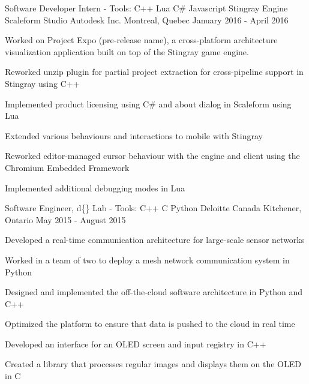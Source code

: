 


\begin{cventries}


\cventry
{Software Developer Intern - Tools: C++ \textbullet{} Lua \textbullet{} C\# \textbullet{} Javascript \textbullet{} Stingray Engine \textbullet{} Scaleform Studio}
{Autodesk Inc.}
{Montreal, Quebec}
{January 2016 - April 2016}
{ %
Worked on Project Expo (pre-release name), a cross-platform architecture visualization application built on top of the Stingray game engine.
\begin{cvitems}
\item[]
\item {Reworked unzip plugin for partial project extraction for cross-pipeline support in Stingray using C++}
\item {Implemented product licensing using C\# and about dialog in Scaleform using Lua}
\item {Extended various behaviours and interactions to mobile with Stingray}
\item {Reworked editor-managed cursor behaviour with the engine and client using the Chromium Embedded Framework}
\item {Implemented additional debugging modes in Lua}
\end{cvitems}
}


\cventry
{Software Engineer, d\{\} Lab - Tools: C++ \textbullet{} C \textbullet{} Python}
{Deloitte Canada} %
{Kitchener, Ontario} %
{May 2015 - August 2015} %
{
Developed a real-time communication architecture for large-scale sensor networks
\begin{cvitems}
\item[]
\item {Worked in a team of two to deploy a mesh network communication system in Python}
\item {Designed and implemented the off-the-cloud software architecture in Python and C++}
\item {Optimized the platform to ensure that data is pushed to the cloud in real time}
\item {Developed an interface for an OLED screen and input registry in C++}
\item {Created a library that processes regular images and displays them on the OLED in C}
\end{cvitems}
}


\end{cventries}

